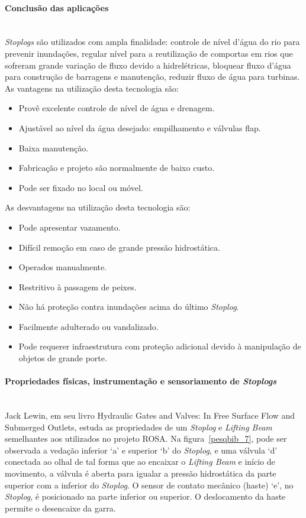 \paragraph{Conclusão das aplicações}\mbox{}\\
\emph{Stoplogs} são utilizados com ampla finalidade: controle de nível d’água do rio para prevenir inundações, regular nível para a reutilização de comportas em rios que sofreram grande variação de fluxo devido a hidrelétricas, bloquear fluxo d’água para construção de barragens e manutenção, reduzir fluxo de água para turbinas.
As vantagens na utilização desta tecnologia são:
\begin{itemize}
\item Provê excelente controle de nível de água e drenagem.
\item Ajustável ao nível da água desejado: empilhamento e válvulas flap.
\item Baixa manutenção.
\item Fabricação e projeto são normalmente de baixo custo.
\item Pode ser fixado no local ou móvel.
\end{itemize}

As desvantagens na utilização desta tecnologia são:
\begin{itemize}
  \item Pode apresentar vazamento.
  \item Difícil remoção em caso de grande pressão hidrostática.
  \item Operados manualmente.
  \item Restritivo à passagem de peixes.
  \item Não há proteção contra inundações acima do último \emph{Stoplog}.
  \item Facilmente adulterado ou vandalizado.
  \item Pode requerer infraestrutura com proteção adicional devido à manipulação
  de objetos de grande porte.
\end{itemize}

\paragraph{Propriedades físicas, instrumentação e sensoriamento de
\emph{Stoplogs}}\mbox{}\\ Jack Lewin, em seu livro Hydraulic Gates and Valves: In Free Surface Flow and Submerged Outlets, estuda as propriedades de um \emph{Stoplog} e \emph{Lifting Beam} semelhantes aos utilizados no projeto ROSA. 
Na figura~\ref{pesqbib_7}, pode ser observada a vedação inferior ‘a’ e superior
‘b’ do \emph{Stoplog}, e uma válvula ‘d’ conectada ao olhal de tal forma que ao encaixar o \emph{Lifting Beam} e início de movimento, a válvula é aberta para igualar a pressão hidrostática da parte superior com a inferior do \emph{Stoplog}. O sensor de contato mecânico (haste) ‘e’, no \emph{Stoplog}, é posicionado na parte inferior ou superior. O deslocamento da haste permite o desencaixe da garra.


